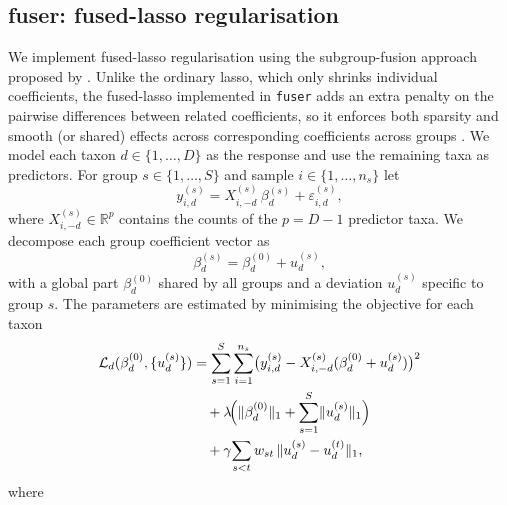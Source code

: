 \documentclass[]{Liebert_Author_revised}
\begin{document}
\subsection{fuser: fused-lasso regularisation}
We implement fused-lasso regularisation using the subgroup-fusion approach proposed by \citet{dondelinger2016hdlss}.
Unlike the ordinary lasso, which only shrinks individual coefficients, the fused-lasso implemented in \texttt{fuser} adds an extra penalty on the pairwise differences between related coefficients, so it enforces both sparsity and smooth (or shared) effects across corresponding coefficients across groups \citep{tibshirani2005fused,dondelinger2016hdlss,fuser2025}.
We model each taxon $d\in\{1,\dots,D\}$ as the response and use the remaining taxa as predictors.
For group
$s\in\{1,\dots,S\}$ and sample $i\in\{1,\dots,n_s\}$ let
\[
y_{i,d}^{(s)} = X_{i,-d}^{(s)} \,\beta_{d}^{(s)} + \varepsilon_{i,d}^{(s)},
\]
where $X_{i,-d}^{(s)}\in\mathbb{R}^{p}$ contains the counts of the
$p=D-1$ predictor taxa. We decompose each group coefficient vector as
\[
\beta_{d}^{(s)} = \beta_{d}^{(0)} + u_{d}^{(s)},
\]
with a global part $\beta_{d}^{(0)}$ shared by all groups and a
deviation $u_{d}^{(s)}$ specific to group $s$.
The parameters are estimated by minimising the objective for each taxon
\[
\begin{aligned}
\mathcal{L}_{d}(\beta_{d}^{(0)},\{u_{d}^{(s)}\}) &= \sum_{s=1}^{S}\sum_{i=1}^{n_s}
  \bigl(y_{i,d}^{(s)} - X_{i,-d}^{(s)}(\beta_{d}^{(0)} + u_{d}^{(s)})\bigr)^{2} \\
&\quad + \lambda\!\Bigl(\lVert\beta_{d}^{(0)}\rVert_{1}
      + \sum_{s=1}^{S}\lVert u_{d}^{(s)}\rVert_{1}\Bigr) \\
&\quad + \gamma\!\sum_{s<t} w_{st}\,
      \lVert u_{d}^{(s)} - u_{d}^{(t)}\rVert_{1},
\end{aligned}
\]
where
\end{document}
